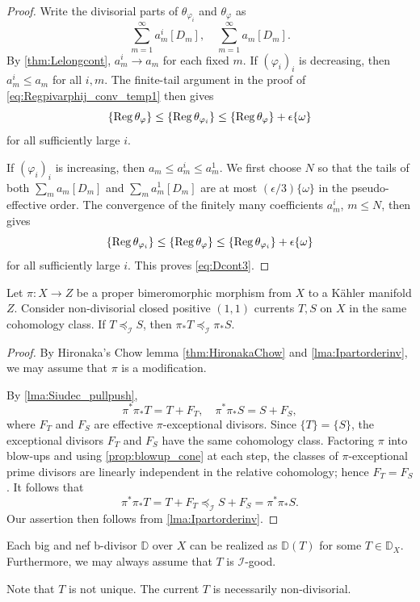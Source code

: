 \begin{proof}
    Write the divisorial parts of $\theta_{\varphi_i}$ and $\theta_{\varphi}$ as
    \[
        \sum_{m=1}^{\infty}a_m^i[D_m],\quad \sum_{m=1}^{\infty}a_m[D_m].
    \]
    By \cref{thm:Lelongcont}, $a_m^i\to a_m$ for each fixed $m$. If $(\varphi_i)_i$ is decreasing, then $a_m^i\leq a_m$ for all $i,m$. The finite-tail argument in the proof of \eqref{eq:Regpivarphij_conv_temp1} then gives
    \[
        \left\{\operatorname{Reg}\theta_{\varphi}\right\}\leq \left\{\operatorname{Reg}\theta_{\varphi_i}\right\}\leq \left\{\operatorname{Reg}\theta_{\varphi}\right\}+\epsilon\{\omega\}
    \]
    for all sufficiently large $i$.

    If $(\varphi_i)_i$ is increasing, then $a_m\leq a_m^i\leq a_m^1$. We first choose $N$ so that the tails of both $\sum_m a_m[D_m]$ and $\sum_m a_m^1[D_m]$ are at most $(\epsilon/3)\{\omega\}$ in the pseudo-effective order. The convergence of the finitely many coefficients $a_m^i$, $m\leq N$, then gives
    \[
        \left\{\operatorname{Reg}\theta_{\varphi_i}\right\}\leq \left\{\operatorname{Reg}\theta_{\varphi}\right\}\leq \left\{\operatorname{Reg}\theta_{\varphi_i}\right\}+\epsilon\{\omega\}
    \]
    for all sufficiently large $i$. This proves \eqref{eq:Dcont3}.
\end{proof}

\begin{lemma}\label{lma:pushIpo}
    Let $\pi\colon X\rightarrow Z$ be a proper bimeromorphic morphism from $X$ to a Kähler manifold $Z$. Consider non-divisorial closed positive $(1,1)$ currents $T,S$ on $X$ in the same cohomology class. If $T\preceq_{\mathcal{I}} S$, then $\pi_*T\preceq_{\mathcal{I}} \pi_*S$.
\end{lemma}
\begin{proof}
    By Hironaka's Chow lemma \cref{thm:HironakaChow} and \cref{lma:Ipartorderinv}, we may assume that $\pi$ is a modification.

    By \cref{lma:Siudec_pullpush},
    \[
    \pi^*\pi_*T=T+F_T,\quad \pi^*\pi_*S=S+F_S,
    \]
    where $F_T$ and $F_S$ are effective $\pi$-exceptional divisors. Since $\{T\}=\{S\}$, the exceptional divisors $F_T$ and $F_S$ have the same cohomology class. Factoring $\pi$ into blow-ups and using \cref{prop:blowup_cone} at each step, the classes of $\pi$-exceptional prime divisors are linearly independent in the relative cohomology; hence $F_T=F_S$. It follows that
    \[
    \pi^*\pi_*T=T+F_T\preceq_{\mathcal{I}}S+F_S=\pi^*\pi_*S.
    \]
    Our assertion then follows from \cref{lma:Ipartorderinv}.
\end{proof}
\begin{theorem}\label{thm:bigandnefreal}
    Each big and nef b-divisor $\mathbb{D}$ over $X$ can be realized as $\mathbb{D}(T)$ for some $T\in \mathbb{D}_X$. Furthermore, we may always assume that $T$ is $\mathcal{I}$-good.
\end{theorem}
Note that $T$ is not unique. The current $T$ is necessarily non-divisorial.

